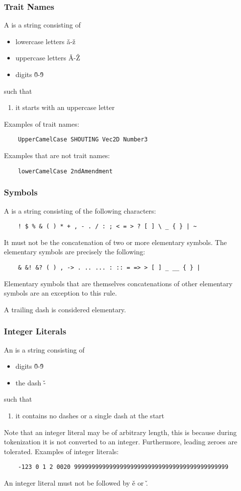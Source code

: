 \documentclass{article}
\begin{document}
\subsubsection{Trait Names}
A \ttrait is a string consisting of
\begin{itemize}
    \item lowercase letters \v a-\v z
    \item uppercase letters \v A-\v Z
    \item digits \v0-\v9
\end{itemize}
such that
\begin{enumerate}
    \item it starts with an uppercase letter
\end{enumerate}
Examples of trait names:
\begin{verbatim}
    UpperCamelCase SHOUTING Vec2D Number3 
\end{verbatim}
Examples that are not trait names:
\begin{verbatim}
    lowerCamelCase 2ndAmendment
\end{verbatim}
\subsubsection{Symbols}
A \tsym is a string consisting of the following
characters:
\begin{verbatim}
    ! $ % & ( ) * + , - . / : ; < = > ? [ ] \ _ { } | ~
\end{verbatim}
It must not be the concatenation of two or more
elementary symbols.
The elementary symbols are precisely the following:
\begin{verbatim}
    & &! &? ( ) , -> . .. ... : :: = => > [ ] _ __ { } |
\end{verbatim}
Elementary symbols that are themselves concatenations of
other elementary symbols are an exception to this rule.

A trailing dash is considered elementary.

\subsubsection{Integer Literals}
An \tint is a string consisting of
\begin{itemize}
    \item digits \v0-\v9
    \item the dash \v-
\end{itemize}
such that
\begin{enumerate}
    \item it contains no dashes or a single dash
    at the start
\end{enumerate}
Note that an integer literal may be of arbitrary length,
this is because during tokenization it is not 
converted to an integer.
Furthermore, leading zeroes are tolerated.
Examples of integer literals:
\begin{verbatim}
    -123 0 1 2 0020 99999999999999999999999999999999999999999999
\end{verbatim}
An integer literal must not be followed by \v e or \v.
\end{document}
